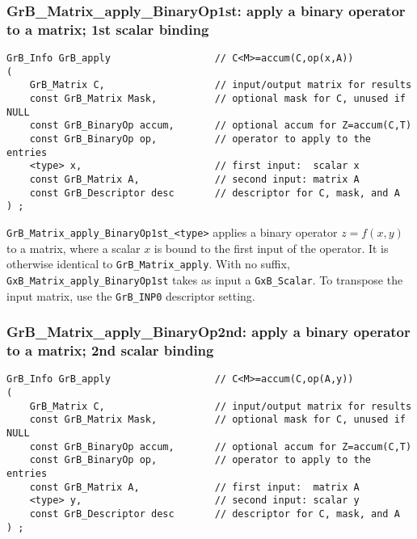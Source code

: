 \documentclass[12pt]{article}
\begin{document}
\newpage
\subsubsection{{\sf GrB\_Matrix\_apply\_BinaryOp1st:} apply a binary operator to a matrix; 1st scalar binding}
\label{matrix_apply1st}

\begin{mdframed}[userdefinedwidth=6in]
{\footnotesize
\begin{verbatim}
GrB_Info GrB_apply                  // C<M>=accum(C,op(x,A))
(
    GrB_Matrix C,                   // input/output matrix for results
    const GrB_Matrix Mask,          // optional mask for C, unused if NULL
    const GrB_BinaryOp accum,       // optional accum for Z=accum(C,T)
    const GrB_BinaryOp op,          // operator to apply to the entries
    <type> x,                       // first input:  scalar x
    const GrB_Matrix A,             // second input: matrix A
    const GrB_Descriptor desc       // descriptor for C, mask, and A
) ;
\end{verbatim} } \end{mdframed}

\verb'GrB_Matrix_apply_BinaryOp1st_<type>'  applies a binary operator
$z=f(x,y)$ to a matrix, where a scalar $x$ is bound to the first input of the
operator.  It is otherwise identical to \verb'GrB_Matrix_apply'.  With no
suffix, \verb'GxB_Matrix_apply_BinaryOp1st' takes as input a \verb'GxB_Scalar'. 
To transpose the input matrix, use the \verb'GrB_INP0' descriptor setting.

\subsubsection{{\sf GrB\_Matrix\_apply\_BinaryOp2nd:} apply a binary operator to a matrix; 2nd scalar binding}
\label{matrix_apply2nd}

\begin{mdframed}[userdefinedwidth=6in]
{\footnotesize
\begin{verbatim}
GrB_Info GrB_apply                  // C<M>=accum(C,op(A,y))
(
    GrB_Matrix C,                   // input/output matrix for results
    const GrB_Matrix Mask,          // optional mask for C, unused if NULL
    const GrB_BinaryOp accum,       // optional accum for Z=accum(C,T)
    const GrB_BinaryOp op,          // operator to apply to the entries
    const GrB_Matrix A,             // first input:  matrix A
    <type> y,                       // second input: scalar y
    const GrB_Descriptor desc       // descriptor for C, mask, and A
) ;
\end{verbatim} } \end{mdframed}
\end{document}
